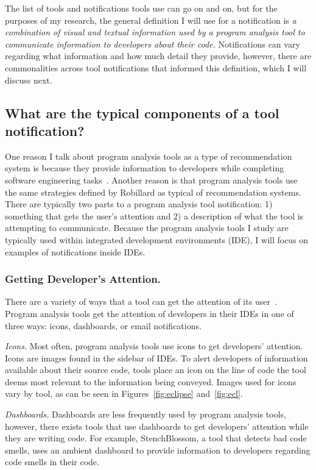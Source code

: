 \documentclass{llncs}
\begin{document}
The list of tools and notifications tools use can go on and on, but for the purposes of my research, the general definition I will use for a notification is \emph{a combination of visual and textual information used by a program analysis tool to communicate information to developers about their code.} Notifications can vary regarding what information and how much detail they provide, however, there are commonalities across tool notifications that informed this definition, which I will discuss next.

\subsection{What are the typical components of a tool notification?}
One reason I talk about program analysis tools as a type of recommendation system is because they provide information to developers while completing software engineering tasks~\cite{robillard2014recommendation}. 
Another reason is that program analysis tools use the same strategies defined by Robillard as typical of recommendation systems.
There are typically two parts to a program analysis tool notification: 1) something that gets the user's attention and 2) a description of what the tool is attempting to communicate.
Because the program analysis tools I study are typically used within integrated development environments (IDE), I will focus on examples of notifications inside IDEs.

\subsubsection{Getting Developer's Attention.}
There are a variety of ways that a tool can get the attention of its user~\cite{robillard2014recommendation}. Program analysis tools get the attention of developers in their IDEs in one of three ways: icons, dashboards, or email notifications.

\noindent\textit{Icons.} Most often, program analysis tools use icons to get developers' attention. Icons are images found in the sidebar of IDEs. To alert developers of information available about their source code, tools place an icon on the line of code the tool deems most relevant to the information being conveyed. Images used for icons vary by tool, as can be seen in Figures~\ref{fig:eclipse} and~\ref{fig:ecl}.

\noindent\textit{Dashboards.} Dashboards are less frequently used by program analysis tools, however, there exists tools that use dashboards to get developers' attention while they are writing code. For example, StenchBlossom, a tool that detects bad code smells, uses an ambient dashboard to provide information to developers regarding code smells in their code.
\end{document}
